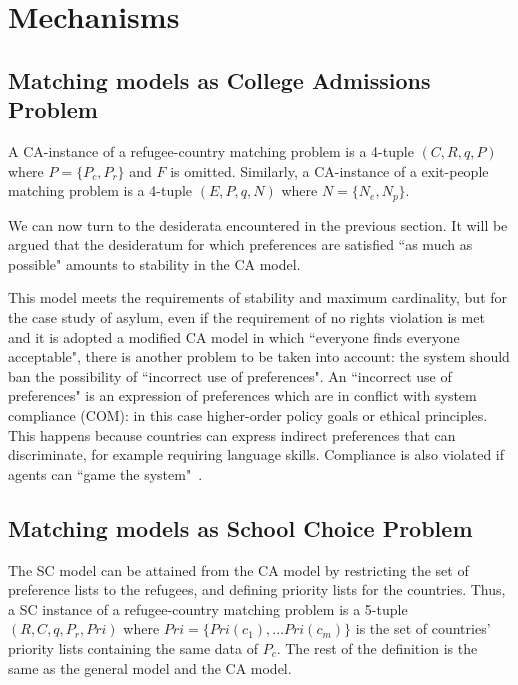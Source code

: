 \section{Mechanisms}\label{mechanisms}%


\subsection{Matching models as College Admissions Problem}\label{matching-model-as-college-admissions-problem}%

A CA-instance of a refugee-country matching problem is a 4-tuple \((C, R, q, P)\) where \(P = \{P_c, P_r\}\) and \(F\) is omitted.
Similarly, a CA-instance of a exit-people matching problem is a 4-tuple \((E, P, q, N)\) where \(N = \{N_e ,  N_p\}\).

We can now turn to the desiderata encountered in the previous section.
It will be argued that the desideratum for which preferences are satisfied “as much as possible" amounts to stability in the CA
model.

This model meets the requirements of stability and maximum cardinality, but for the case study of asylum, even if the requirement of no rights violation is met and it is adopted a modified CA model in which “everyone finds everyone acceptable", there is another problem to be taken into account: the system should ban the possibility of “incorrect use of preferences".
An “incorrect use of preferences" is an expression of preferences which are in conflict with system compliance (COM): in this case higher-order policy goals or ethical principles.
This happens because countries can express indirect preferences that can discriminate, for example requiring language skills.
Compliance is also violated if agents can “game the system"~\cite{basshuysen}.


\subsection{Matching models as School Choice Problem}\label{matching-model-as-school-choice-problem}%

The SC model can be attained from the CA model by restricting the set of preference lists to the refugees, and defining priority lists for the countries.
Thus, a SC instance of a refugee-country matching problem is a 5-tuple \((R, C, q, P_r, Pri)\) where \(Pri = \{Pri(c_1), \ldots Pri(c_m)\}\) is the set of countries’ priority lists containing the same data of \(P_c\).
The rest of the definition is the same as the general model and the CA model.

